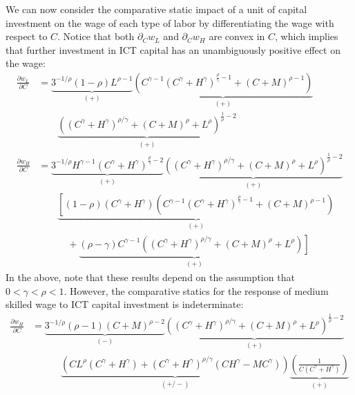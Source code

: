 \documentclass[a4paper]{article}
\begin{document}
We can now consider the comparative static impact of a unit of capital investment on the wage of each type of labor by differentiating the wage with respect to $C$. Notice that both $\partial_Cw_L$ and $\partial_Cw_H$ are convex in $C$, which implies that further investment in ICT capital has an unambiguously positive effect on the wage:
\begin{align*}
\frac{\partial w_L}{\partial C}
  &= \underbrace{3^{-1/\rho } \left(1 - \rho \right) L^{\rho -1}}_{(+)}
\underbrace{\left(C^{\gamma -1} \left(C^{\gamma }+H^{\gamma }\right)^{\frac{\rho }{\gamma }-1}+(C+M)^{\rho -1}\right)}_{(+)}\\
&\quad\quad \underbrace{\left(\left(C^{\gamma }+H^{\gamma }\right)^{\rho /\gamma }+(C+M)^{\rho }+L^{\rho }\right)^{\frac{1}{\rho }-2}}_{(+)} \\
% 
\frac{\partial w_H}{\partial C}
&= \underbrace{3^{-1/\rho } H^{\gamma -1} \left(C^{\gamma }+H^{\gamma }\right)^{\frac{\rho }{\gamma }-2}}_{(+)} 
\underbrace{\left(\left(C^{\gamma }+H^{\gamma }\right)^{\rho /\gamma }+(C+M)^{\rho }+L^{\rho }\right)^{\frac{1}{\rho }-2}}_{(+)} \\
&\quad\quad \underbrace{\left[\left(1-\rho \right) \left(C^{\gamma }+H^{\gamma }\right) \left(C^{\gamma -1} \left(C^{\gamma }+H^{\gamma }\right)^{\frac{\rho }{\gamma }-1}+(C+M)^{\rho -1}\right) \right.}_{(+)}\\
&\quad\quad\quad  + \underbrace{\left.(\rho - \gamma) C^{\gamma -1} \left(\left(C^{\gamma }+H^{\gamma }\right)^{\rho /\gamma }+(C+M)^{\rho }+L^{\rho }\right)\right]}_{(+)}
\end{align*}
In the above, note that these results depend on the assumption that $0 < \gamma < \rho < 1$. However, the comparative statics for the response of medium skilled wage to ICT capital investment is indeterminate:
\begin{align*}
  \frac{\partial w_H}{\partial C}
&= \underbrace{3^{-1/\rho } (\rho -1) (C+M)^{\rho -2}}_{(-)}
\underbrace{\left(\left(C^{\gamma }+H^{\gamma }\right)^{\rho /\gamma }+(C+M)^{\rho }+L^{\rho }\right)^{\frac{1}{\rho }-2}}_{(+)} \\
&\quad\quad\quad\underbrace{\left(C L^{\rho } \left(C^{\gamma }+H^{\gamma }\right)+\left(C^{\gamma }+H^{\gamma }\right)^{\rho /\gamma } \left(C H^{\gamma }-M C^{\gamma }\right)\right)}_{(+/-)}
\underbrace{\left(\frac{1}{C\left(C^{\gamma }+H^{\gamma }\right)}\right)}_{(+)}
\end{align*}
\end{document}
